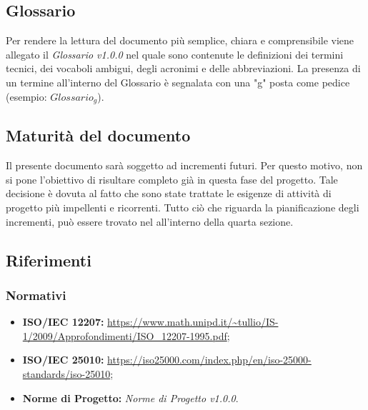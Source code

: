 \subsection{Glossario}
Per rendere la lettura del documento più semplice, chiara e comprensibile viene allegato il \emph{Glossario v1.0.0} nel quale sono contenute le definizioni dei termini tecnici, dei vocaboli ambigui, degli acronimi e delle abbreviazioni. La presenza di un termine all'interno del Glossario è segnalata con una "g" posta come pedice (esempio: $Glossario_{g}$).
\subsection{Maturità del documento}
Il presente documento sarà soggetto ad incrementi futuri. Per questo motivo, non si pone l'obiettivo di risultare completo già in questa fase del progetto.
Tale decisione è dovuta al fatto che sono state trattate le esigenze di attività di progetto più impellenti e ricorrenti.
Tutto ciò che riguarda la pianificazione degli incrementi, può essere trovato nel \emph{} all'interno della quarta sezione.  
\subsection{Riferimenti}

\subsubsection{Normativi}
\begin{itemize}
	\item \textbf{ISO/IEC 12207:} \url{https://www.math.unipd.it/~tullio/IS-1/2009/Approfondimenti/ISO_12207-1995.pdf};
	\item \textbf{ISO/IEC 25010:} \url{https://iso25000.com/index.php/en/iso-25000-standards/iso-25010};
	\item \textbf{Norme di Progetto:} \emph{Norme di Progetto v1.0.0}.
\end{itemize}
